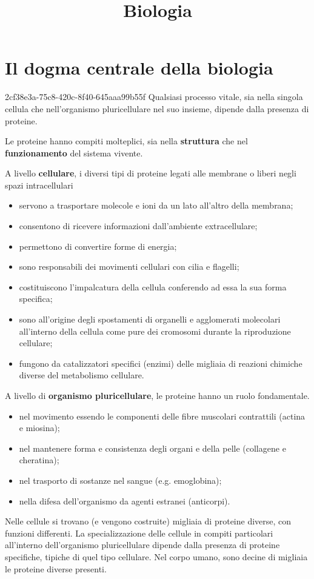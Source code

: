 \documentclass[preview]{standalone}
\begin{document}
\title{Biologia}
\genpage

\section{Il dogma centrale della biologia}

\begin{snippet}{2cf38e3a-75c8-420c-8f40-645aaa99b55f}
    Qualsiasi processo vitale, sia nella singola cellula che nell'organismo pluricellulare nel suo
    insieme, dipende dalla presenza di proteine.

    Le proteine hanno compiti molteplici, sia nella \textbf{struttura}
    che nel \textbf{funzionamento} del sistema
    vivente.

    A livello \textbf{cellulare}, i diversi tipi di proteine legati alle membrane o liberi negli spazi
    intracellulari

    \begin{itemize}
        \item servono a trasportare molecole e ioni da un lato all'altro della membrana;
        \item consentono di ricevere informazioni dall'ambiente extracellulare;
        \item permettono di convertire forme di energia;
        \item sono responsabili dei movimenti cellulari con cilia e flagelli;
        \item costituiscono l'impalcatura della cellula conferendo ad essa la sua forma specifica;
        \item sono all'origine degli spostamenti di organelli e agglomerati molecolari all'interno della
        cellula come pure dei cromosomi durante la riproduzione cellulare;
        \item fungono da catalizzatori specifici (enzimi) delle migliaia di reazioni chimiche diverse del
        metabolismo cellulare.
    \end{itemize}

    A livello di \textbf{organismo pluricellulare}, le proteine hanno un ruolo
    fondamentale.

    \begin{itemize}
        \item nel movimento essendo le componenti delle fibre muscolari contrattili
        (actina e miosina);
        \item nel mantenere forma e consistenza degli organi e della pelle (collagene e
        cheratina);
        \item nel trasporto di sostanze nel sangue (e.g. emoglobina);
        \item nella difesa dell'organismo da agenti estranei (anticorpi).
    \end{itemize}
    
    Nelle cellule si trovano (e vengono costruite) migliaia di proteine diverse, con
    funzioni differenti. La specializzazione delle cellule in compiti particolari
    all'interno dell'organismo pluricellulare dipende dalla presenza di proteine
    specifiche, tipiche di quel tipo cellulare. Nel corpo umano, sono decine di
    migliaia le proteine diverse presenti.
\end{snippet}
\end{document}

